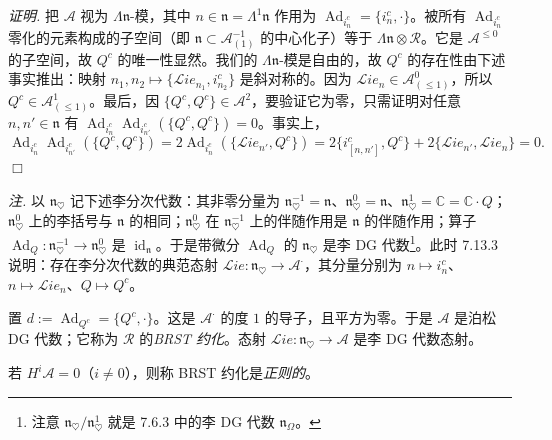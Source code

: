 \emph{证明.} 把 $\mathcal{A}$ 视为 $\Lambda\mathfrak{n}$-模，其中 $n\in\mathfrak{n}=\Lambda^{1}\mathfrak{n}$ 作用为 $\operatorname{Ad}_{i^{c}_n}=\{i^{c}_n,\cdot\}$。被所有 $\operatorname{Ad}_{i^{c}_n}$ 零化的元素构成的子空间（即 $\mathfrak{n}\subset\mathcal{A}^{-1}_{(1)}$ 的中心化子）等于 $\Lambda\mathfrak{n}\otimes\mathcal{R}$。它是 $\mathcal{A}^{\le0}$ 的子空间，故 $Q^{c}$ 的唯一性显然。我们的 $\Lambda\mathfrak{n}$-模是自由的，故 $Q^{c}$ 的存在性由下述事实推出：映射 $n_1,n_2\mapsto\{\mathcal{L}ie_{n_1},i^{c}_{n_2}\}$ 是斜对称的。因为 $\mathcal{L}ie_n\in\mathcal{A}^{0}_{(\le1)}$，所以 $Q^{c}\in\mathcal{A}^{1}_{(\le1)}$。最后，因 $\{Q^{c},Q^{c}\}\in\mathcal{A}^{2}$，要验证它为零，只需证明对任意 $n,n'\in\mathfrak{n}$ 有 $\operatorname{Ad}_{i^{c}_n}\operatorname{Ad}_{i^{c}_{n'}}(\{Q^{c},Q^{c}\})=0$。事实上，
\[
\operatorname{Ad}_{i^{c}_n}\operatorname{Ad}_{i^{c}_{n'}}(\{Q^{c},Q^{c}\})
=2\operatorname{Ad}_{i^{c}_n}(\{\mathcal{L}ie_{n'},Q^{c}\})
=2\{i^{c}_{[n,n']},Q^{c}\}+2\{\mathcal{L}ie_{n'},\mathcal{L}ie_n\}=0.
\]
\hfill$\Box$

\emph{注.} 以 $\mathfrak{n}_{\heartsuit}$ 记下述李分次代数：其非零分量为 $\mathfrak{n}^{-1}_{\heartsuit}=\mathfrak{n}$、$\mathfrak{n}^{0}_{\heartsuit}=\mathfrak{n}$、$\mathfrak{n}^{1}_{\heartsuit}=\mathbb{C}=\mathbb{C}\cdot Q$；$\mathfrak{n}^{0}_{\heartsuit}$ 上的李括号与 $\mathfrak{n}$ 的相同；$\mathfrak{n}^{0}_{\heartsuit}$ 在 $\mathfrak{n}^{-1}_{\heartsuit}$ 上的伴随作用是 $\mathfrak{n}$ 的伴随作用；算子 $\operatorname{Ad}_{Q}:\mathfrak{n}^{-1}_{\heartsuit}\to\mathfrak{n}^{0}_{\heartsuit}$ 是 $\operatorname{id}_{\mathfrak{n}}$。于是带微分 $\operatorname{Ad}_{Q}$ 的 $\mathfrak{n}_{\heartsuit}$ 是李 DG 代数\footnote{注意 $\mathfrak{n}_{\heartsuit}/\mathfrak{n}^{1}_{\heartsuit}$ 就是 7.6.3 中的李 DG 代数 $\mathfrak{n}_{\Omega}$。}。此时 7.13.3 说明：存在李分次代数的典范态射 $\mathcal{L}ie:\mathfrak{n}_{\heartsuit}\to\mathcal{A}^{\cdot}$，其分量分别为 $n\mapsto i^{c}_n$、$n\mapsto\mathcal{L}ie_n$、$Q\mapsto Q^{c}$。

 置 $d:=\operatorname{Ad}_{Q^{c}}=\{Q^{c},\cdot\}$。这是 $\mathcal{A}^{\cdot}$ 的度 $1$ 的导子，且平方为零。于是 $\mathcal{A}$ 是泊松 DG 代数；它称为 $\mathcal{R}$ 的\emph{BRST 约化}。态射 $\mathcal{L}ie:\mathfrak{n}_{\heartsuit}\to\mathcal{A}$ 是李 DG 代数态射。

若 $H^{i}\mathcal{A}=0$（$i\ne0$），则称 BRST 约化是\emph{正则的}。

